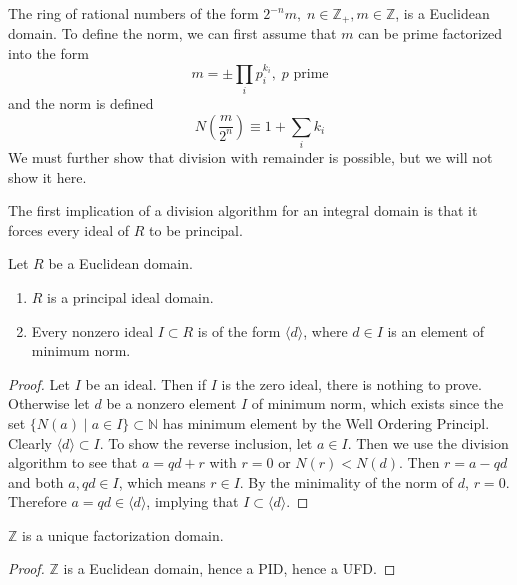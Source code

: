   \begin{example}
    The ring of rational numbers of the form $2^{-n} m, \; n \in \mathbb{Z}_+, m \in \mathbb{Z}$, is a Euclidean domain. To define the norm, we can first assume that $m$ can be prime factorized into the form 
    \begin{equation}
      m = \pm \prod_{i} p_{i}^{k_i}, \; p \text{ prime}
    \end{equation}
    and the norm is defined 
    \begin{equation}
      N(\frac{m}{2^n}) \equiv 1 + \sum_i k_i
    \end{equation}
    We must further show that division with remainder is possible, but we will not show it here. 
  \end{example}

  The first implication of a division algorithm for an integral domain is that it forces every ideal of $R$ to be principal. 

  \begin{theorem}
    Let $R$ be a Euclidean domain. 
    \begin{enumerate}
      \item $R$ is a principal ideal domain. 
      \item Every nonzero ideal $I \subset R$ is of the form $\langle d \rangle$, where $d \in I$ is an element of minimum norm. 
    \end{enumerate}
  \end{theorem}
  \begin{proof}
    Let $I$ be an ideal. Then if $I$ is the zero ideal, there is nothing to prove. Otherwise let $d$ be a nonzero element $I$ of minimum norm, which exists since the set $\{N(a) \mid a \in I \} \subset \mathbb{N}$ has minimum element by the Well Ordering Principl. Clearly $\langle d \rangle \subset I$. To show the reverse inclusion, let $a \in I$. Then we use the division algorithm to see that $a = qd + r$ with $r = 0$ or $N(r) < N(d)$. Then $r = a - qd$ and both $a, qd \in I$, which means $r \in I$. By the minimality of the norm of $d$, $r = 0$. Therefore $a = qd \in \langle d \rangle$, implying that $I \subset \langle d \rangle$. 
  \end{proof}

  \begin{corollary}
    $\mathbb{Z}$ is a unique factorization domain. 
  \end{corollary}
  \begin{proof}
    $\mathbb{Z}$ is a Euclidean domain, hence a PID, hence a UFD. 
  \end{proof}

